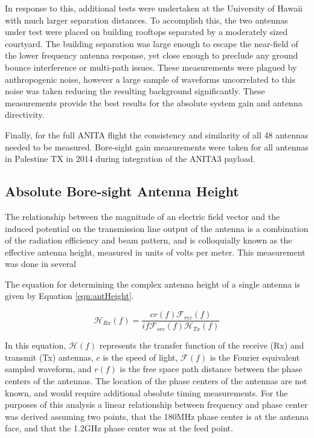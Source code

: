 	In response to this, additional tests were undertaken at the University of Hawaii with much larger separation distances.  To accomplish this, the two antennas under test were placed on building rooftops separated by a moderately sized courtyard.  The building separation was large enough to escape the near-field of the lower frequency antenna response, yet close enough to preclude any ground bounce interference or multi-path issues.  These measurements were plagued by anthropogenic noise, however a large sample of waveforms uncorrelated to this noise was taken reducing the resulting background significantly.  These measurements provide the best results for the absolute system gain and antenna directivity.
	
	Finally, for the full ANITA flight the consistency and similarity of all 48 antennas needed to be measured.  Bore-sight gain measurements were taken for all antennas in Palestine TX in 2014 during integration of the ANITA3 payload.
	
	\subsection{Absolute Bore-sight Antenna Height}
		
		The relationship between the magnitude of an electric field vector and the induced potential on the transmission line output of the antenna is a combination of the radiation efficiency and beam pattern, and is colloquially known as the effective antenna height, measured in units of volts per meter.  This measurement was done in several  
		
		
	The equation for determining the complex antenna height of a single antenna is given by Equation \ref{eqn:antHeight}.
	
\begin{equation}
\mathcal{H}_{Rx}(f) = \frac{ c r(f) \mathcal{F}_{rec}(f)}{ if \mathcal{F}_{src}(f) \mathcal{H}_{Tx}(f) } 
\label{eqn:antHeight}
\end{equation}

In this equation, $\mathcal{H}(f)$ represents the transfer function of the receive (Rx) and transmit (Tx) antennas, $c$ is the speed of light, $\mathcal{F}(f)$ is the Fourier equivalent sampled waveform, and $r(f)$ is the free space path distance between the phase centers of the antennas.  The location of the phase centers of the antennas are not known, and would require additional absolute timing measurements.  For the purposes of this analysis a linear relationship between frequency and phase center was derived assuming two points, that the 180MHz phase center is at the antenna face, and that the 1.2GHz phase center was at the feed point.

